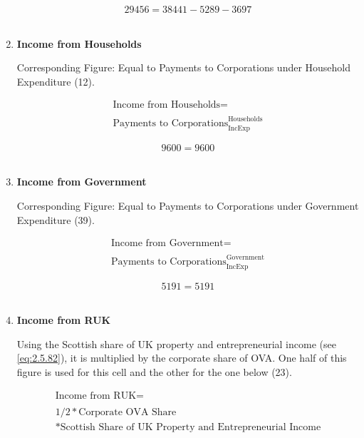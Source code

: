 \begin{enumerate}
\begin{equation} \nonumber
29456 = 38441-5289-3697
\end{equation}\\


\item \textbf {Income from Households}

Corresponding Figure: Equal to Payments to Corporations under Household Expenditure (12).

\begin{equation}
\begin{split}
\text{Income from Households} =  \\ \\
\text{Payments to Corporations}^\text{Households}_\text{IncExp}
\end{split} \label{eq:2.5.24}
\end{equation}

\begin{equation} \nonumber
9600 = 9600
\end{equation}\\


\item \textbf {Income from Government}

Corresponding Figure: Equal to Payments to Corporations under Government Expenditure (39).

\begin{equation}
\begin{split}
\text{Income from Government} =  \\ \\
\text{Payments to Corporations}^\text{Government}_\text{IncExp}
\end{split} \label{eq:2.5.25}
\end{equation}

\begin{equation} \nonumber
5191 = 5191
\end{equation}\\


\item \textbf {Income from RUK}

Using the Scottish share of UK property and entrepreneurial income (see \ref{eq:2.5.82}), it is multiplied by the corporate share of OVA. One half of this figure is used for this cell and the other for the one below (23). \cite{ONS2011c}

\begin{equation}
\begin{split}
\text{Income from RUK} =  \\ \\
1/2*\text{Corporate OVA Share}\\
*\text{Scottish Share of UK Property and Entrepreneurial Income}
\end{split} \label{eq:2.5.26}
\end{equation}


\end{enumerate}
